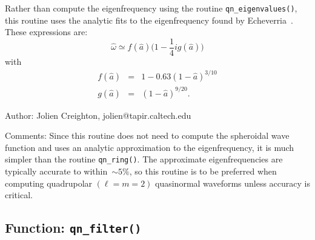 Rather than compute the eigenfrequency using the routine
\texttt{qn\_eigenvalues()}, this routine uses the analytic fits to the
eigenfrequency found by Echeverria~\cite{echeverria:1989}.
These expressions are:
\begin{equation}
  \hat{\omega} \simeq f(\hat{a}) \bigl( 1 - {\textstyle\frac{1}{4}}ig(\hat{a})
  \bigr)
\end{equation}
with
\begin{eqnarray}
  f(\hat{a}) &=& 1 - 0.63(1-\hat{a})^{3/10} \\
  g(\hat{a}) &=& (1-\hat{a})^{9/20}.
\end{eqnarray}

\begin{description}
\item{Author:}  Jolien Creighton, jolien@tapir.caltech.edu
\item{Comments:}  Since this routine does not need to compute the spheroidal
  wave function and uses an analytic approximation to the eigenfrequency,
  it is much simpler than the routine \texttt{qn\_ring()}.  The approximate
  eigenfrequencies are typically accurate to within~$\sim5\%$, so this routine
  is to be preferred when computing quadrupolar $(\ell=m=2)$ quasinormal
  waveforms unless accuracy is critical.
\end{description}


\clearpage
\subsection{Function: \texttt{qn\_filter()}}

